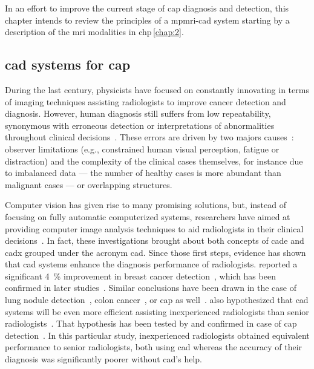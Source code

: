 In an effort to improve the current stage of \ac{cap} diagnosis and detection,
this chapter intends to review the principles of a \ac{mpmri}-\acs{cad}
system starting by a description of the \ac{mri} modalities in
\acs{chp}\,\ref{chap:2}.

\subsection{\acs*{cad} systems for \acs*{cap}}\label{sec:intro:cad}
During the last century, physicists have focused on constantly innovating in
terms of imaging techniques assisting radiologists to improve cancer detection
and diagnosis.
However, human diagnosis still suffers from low repeatability, synonymous with
erroneous detection or interpretations of abnormalities throughout clinical
decisions~\cite{Giger2008,Hambrock2013}.
These errors are driven by two majors causes~\cite{Giger2008}: observer
limitations (e.g., constrained human visual perception, fatigue or distraction)
and the complexity of the clinical cases themselves, for instance due to
imbalanced data --- the number of healthy cases is more abundant than malignant
cases --- or overlapping structures.

Computer vision has given rise to many promising solutions, but, instead of
focusing on fully automatic computerized systems, researchers have aimed at
providing computer image analysis techniques to aid radiologists in their
clinical decisions~\cite{Giger2008}.
In fact, these investigations brought about both concepts of \ac{cade} and
\ac{cadx} grouped under the acronym \ac{cad}.
Since those first steps, evidence has shown that \ac{cad} systems enhance the
diagnosis performance of radiologists.
\citeauthor{Chan1999} reported a significant \SI{4}{\percent} improvement in
breast cancer detection~\cite{Chan1999}, which has been confirmed in later
studies~\cite{Dean2006}.
Similar conclusions have been drawn in the case of lung nodule
detection~\cite{Li2004}, colon cancer~\cite{Petrick2008}, or \ac{cap} as
well~\cite{Hambrock2013}.
\citeauthor{Chan1999} also hypothesized that \acs{cad} systems will be even
more efficient assisting inexperienced radiologists than senior
radiologists~\cite{Chan1999}.
That hypothesis has been tested by \citeauthor{Hambrock2013} and confirmed in
case of \ac{cap} detection~\cite{Hambrock2013}.
In this particular study, inexperienced radiologists obtained equivalent
performance to senior radiologists, both using \acs{cad} whereas the accuracy
of their diagnosis was significantly poorer without \ac{cad}'s help.


